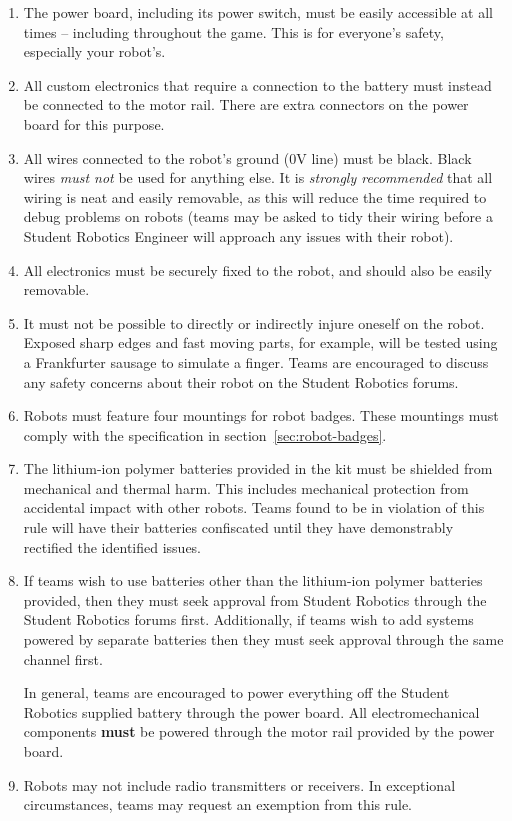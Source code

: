 \begin{enumerate}
\item The power board, including its power switch, must be easily accessible at all times -- including throughout the game.
      This is for everyone's safety, especially your robot's.

\item All custom electronics that require a connection to the battery must instead be connected to the motor rail.
      There are extra connectors on the power board for this purpose.

\item All wires connected to the robot's ground (0V line) must be black.
      Black wires \emph{must not} be used for anything else.
      It is \emph{strongly recommended} that all wiring is neat and easily removable, as this will reduce the time required to debug problems on robots
       (teams may be asked to tidy their wiring before a Student Robotics Engineer will approach any issues with their robot).

\item All electronics must be securely fixed to the robot, and should also be easily removable.

\item It must not be possible to directly or indirectly injure oneself on the robot.
      Exposed sharp edges and fast moving parts, for example, will be tested using a Frankfurter sausage to simulate a finger.
      Teams are encouraged to discuss any safety concerns about their robot on the Student Robotics forums.

\item Robots must feature four mountings for robot badges.
      These mountings must comply with the specification in section~\ref{sec:robot-badges}.

\item The lithium-ion polymer batteries provided in the kit must be shielded from mechanical and thermal harm.
      This includes mechanical protection from accidental impact with other robots.
      Teams found to be in violation of this rule will have their batteries confiscated until they have demonstrably rectified the identified issues.

\item If teams wish to use batteries other than the lithium-ion polymer batteries provided,
       then they must seek approval from Student Robotics through the Student Robotics forums first.
      Additionally, if teams wish to add systems powered by separate batteries then they must seek approval through the same channel first.

      In general, teams are encouraged to power everything off the Student Robotics supplied battery through the power board.
      All electromechanical components \textbf{must} be powered through the motor rail provided by the power board.

\item Robots may not include radio transmitters or receivers.
      In exceptional circumstances, teams may request an exemption from this rule.

\end{enumerate}
